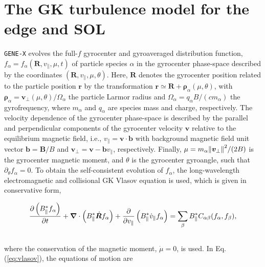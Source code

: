 \documentclass[preprint,12pt]{elsarticle}
\begin{document}

\section{The GK turbulence model for the edge and SOL}
\label{sec:genexmodel} 

\verb|GENE-X| evolves the full-$f$ gyrocenter and gyroaveraged distribution function, $ f_\alpha = f_\alpha(\bm{R}, v_\parallel, \mu,t)$ of particle species $\alpha$ in the gyrocenter phase-space described by the coordinates $(\bm{R}, v_\parallel, \mu, \theta)$. Here, $\bm{R}$ denotes the gyrocenter position related to the particle position $\bm{r}$ by the transformation $\bm{r} \simeq \bm{R} + \bm{\rho}_\alpha(\mu, \theta)$, with $\bm{\rho}_\alpha = \bm{v}_\perp(\mu, \theta)/ \Omega_\alpha$ the particle Larmor radius and $\Omega_\alpha = q_\alpha B / (c m_\alpha)$ the gyrofrequency, where $m_\alpha$ and $q_\alpha$ are species mass and charge, respectively. The velocity dependence of the gyrocenter phase-space is described by the parallel and perpendicular components of the gyrocenter velocity $\bm{v}$ relative to the equilibrium magnetic field, i.e., $v_\parallel = \bm{v} \cdot \bm{b}$ with background magnetic field unit vector $\bm{b} = \bm{B} / B$ and $ \bm v_\perp = \bm v - \bm b v_\parallel$, respectively. Finally, $\mu = m_\alpha \norm{\bm v_\perp}^2 /(2B)$ is the gyrocenter magnetic moment, and $\theta$ is the gyrocenter gyroangle, such that $\partial_\theta f_\alpha = 0$. To obtain the self-consistent evolution of $f_\alpha$, the long-wavelength electromagnetic and collisional GK Vlasov equation is used, which is given in conservative form,

\begin{align}
\label{eq:vlasov}
\frac{\partial \left(  B_{\|}^*  f_\alpha  \right)}{\partial t}  + \grad \cdot \left( B_{\|}^* \dot{\bm R} f_\alpha \right) +  \frac{\partial}{\partial v_{\|}}\left(   B_{\|}^* \dot v_\parallel f_\alpha \right) = \sum_{\beta} B_{\|}^* C_{\alpha \beta}(f_\alpha, f_\beta),
\end{align}
\\
where the conservation of the magnetic moment, $\dot \mu = 0$, is used. In Eq. (\ref{eq:vlasov}), the equations of motion are 
\end{document}
